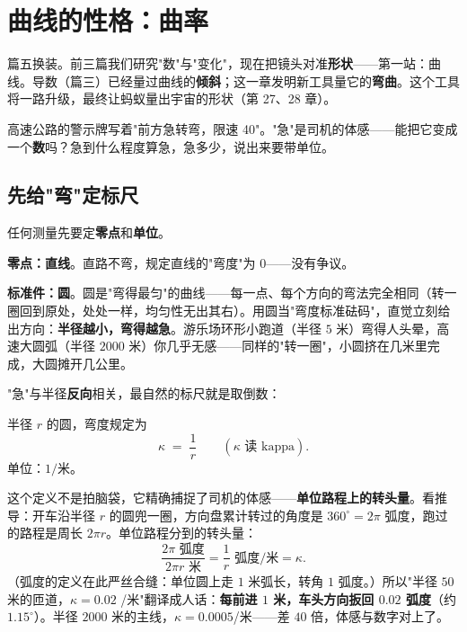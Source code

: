 \chapter{曲线的性格：曲率}

篇五换装。前三篇我们研究"数"与"变化"，现在把镜头对准\textbf{形状}——第一站：曲线。导数（篇三）已经量过曲线的\textbf{倾斜}；这一章发明新工具量它的\textbf{弯曲}。这个工具将一路升级，最终让蚂蚁量出宇宙的形状（第 27、28 章）。

\begin{kaiwei}
高速公路的警示牌写着"前方急转弯，限速 40"。"急"是司机的体感——能把它变成一个\textbf{数}吗？急到什么程度算急，急多少，说出来要带单位。
\end{kaiwei}

\section{先给"弯"定标尺}

任何测量先要定\textbf{零点}和\textbf{单位}。

\textbf{零点：直线}。直路不弯，规定直线的"弯度"为 $0$——没有争议。

\textbf{标准件：圆}。圆是"弯得最匀"的曲线——每一点、每个方向的弯法完全相同（转一圈回到原处，处处一样，均匀性无出其右）。用圆当"弯度标准砝码"，直觉立刻给出方向：\textbf{半径越小，弯得越急}。游乐场环形小跑道（半径 $5$ 米）弯得人头晕，高速大圆弧（半径 $2000$ 米）你几乎无感——同样的"转一圈"，小圆挤在几米里完成，大圆摊开几公里。

"急"与半径\textbf{反向}相关，最自然的标尺就是取倒数：

\begin{dingyi}
半径 $r$ 的圆，弯度规定为
\[
\kappa \;=\; \frac{1}{r} \qquad (\kappa \text{ 读 kappa}) .
\]
单位：$1/$米。
\end{dingyi}

这个定义不是拍脑袋，它精确捕捉了司机的体感——\textbf{单位路程上的转头量}。看推导：开车沿半径 $r$ 的圆兜一圈，方向盘累计转过的角度是 $360^\circ = 2\pi$ 弧度，跑过的路程是周长 $2\pi r$。单位路程分到的转头量：
\[
\frac{2\pi \text{ 弧度}}{2\pi r \text{ 米}} = \frac{1}{r} \text{ 弧度/米} = \kappa .
\]
（弧度的定义在此严丝合缝：单位圆上走 $1$ 米弧长，转角 $1$ 弧度。）所以"半径 $50$ 米的匝道，$\kappa = 0.02$ /米"翻译成人话：\textbf{每前进 $1$ 米，车头方向扳回 $0.02$ 弧度}（约 $1.15^\circ$）。半径 $2000$ 米的主线，$\kappa = 0.0005$/米——差 $40$ 倍，体感与数字对上了。

